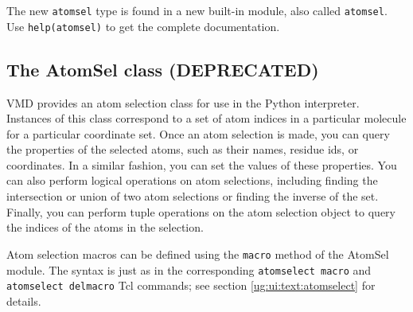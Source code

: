 The new {\tt atomsel} type is found in a new built-in module, also
called {\tt atomsel}.  Use {\tt help(atomsel)} to get the complete
documentation.


\subsection{The AtomSel class (DEPRECATED)}

VMD provides an atom selection class for use in the Python interpreter.
Instances of this class correspond to a set of atom indices in a 
particular molecule for a particular coordinate set.  Once an atom 
selection is made, you can query the properties of the selected atoms,
such as their names, residue ids, or coordinates.  In a similar fashion,
you can set the values of these properties.  You can also perform logical
operations on atom selections, including finding the intersection or 
union of two atom selections or finding the inverse of the set.  Finally,
you can perform tuple operations on the atom selection object to query
the indices of the atoms in the selection.


Atom selection macros can be defined using the {\tt macro} method of the
AtomSel module.  The syntax is just as in the corresponding {\tt atomselect 
macro} and {\tt atomselect delmacro} Tcl commands; see 
section \ref{ug:ui:text:atomselect} for details.

\newcommand{\pymodentry}[2]{
  \item {\tt #1}: #2
}

